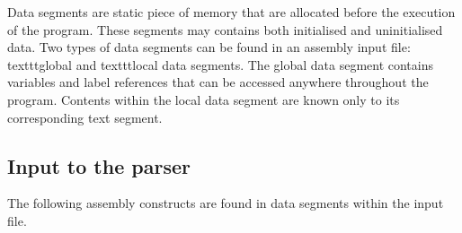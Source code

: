 Data segments are static piece of memory that are allocated before the 
execution of the program.  
These segments may contains both initialised and uninitialised data.
Two types of data segments can be found in an assembly input file: 
texttt{global} and texttt{local} data segments.
The global data segment contains variables and label references that can be
accessed anywhere throughout the program.  
Contents within the local data segment are known only to its corresponding 
text segment.

\subsection *{Input to the parser}

The following assembly constructs are found in data segments within the input
file.

